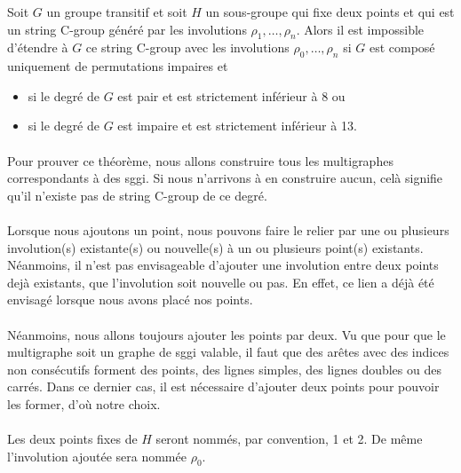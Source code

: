 \begin{theorem}
  Soit $G$ un groupe transitif et soit $H$ un sous-groupe qui fixe deux points et qui est un string C-group généré par les involutions $\rho_1, \dots, \rho_n$. Alors il est impossible d'étendre à $G$ ce string C-group avec les involutions $\rho_0, \dots, \rho_n$ si $G$ est composé uniquement de permutations impaires et
  \begin{itemize}
    \item si le degré de $G$ est pair et est strictement inférieur à 8 ou
    \item si le degré de $G$ est impaire et est strictement inférieur à 13.
  \end{itemize}
\end{theorem}

\paragraph{}
Pour prouver ce théorème, nous allons construire tous les multigraphes correspondants à des sggi. Si nous n'arrivons à en construire aucun, celà signifie qu'il n'existe pas de string C-group de ce degré.

\paragraph{}
Lorsque nous ajoutons un point, nous pouvons faire le relier par une ou plusieurs involution(s) existante(s) ou nouvelle(s) à un ou plusieurs point(s) existants.
Néanmoins, il n'est pas envisageable d'ajouter une involution entre deux points dejà existants, que l'involution soit nouvelle ou pas. En effet, ce lien a déjà été envisagé lorsque nous avons placé nos points.

\paragraph{}
Néanmoins, nous allons toujours ajouter les points par deux. Vu que pour que le multigraphe soit un graphe de sggi valable, il faut que des arêtes avec des indices non consécutifs forment des points, des lignes simples, des lignes doubles ou des carrés. Dans ce dernier cas, il est nécessaire d'ajouter deux points pour pouvoir les former, d'où notre choix.

\paragraph{}
Les deux points fixes de $H$ seront nommés, par convention, 1 et 2. De même l'involution ajoutée sera nommée $\rho_0$.

